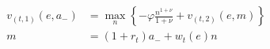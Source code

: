 \begin{align} \tag{labor}
    v_{(t,1)}(e, a_{-}) & = \max_{n} \left\{ - \varphi \frac{n^{1+\nu}}{1+\nu} + v_{(t,2)}(e,m) \right\}
    \\
    m                   & = (1 + r_t)a_{-} + w_t(e) n
\end{align}
